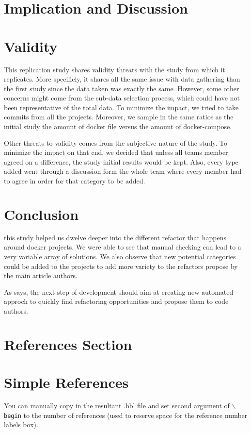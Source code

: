 \documentclass[lettersize,journal]{IEEEtran}
\begin{document}
\section{Implication and Discussion}

\section{Validity}

This replication study shares validity threats with the study from \cite{1} which it replicates.
More specificly, it shares all the same issue with data gathering than the first study since the data taken was exactly the same.
However, some other concerns might come from the sub-data selection process, which could have not been representative of the total data.
To minimize the impact, we tried to take commits from all the projects.
Moreover, we sample in the same ratios as the initial study the amount of docker file versus the amount of docker-compose.

Other threats to validity comes from the subjective nature of the study.
To minimize the impact on that end, we decided that unless all teams member agreed on a difference, the study initial results would be kept.
Also, every type added went through a discussion form the whole team where every member had to agree in order for that category to be added.

\section{Conclusion}
this study helped us dwelve deeper into the different refactor that happens around docker projects.
We were able to see that manual checking can lead to a very variable array of solutions.
We also observe that new potential categories could be added to the projects to add more variety to the refactors propose by the main article authors.

As \cite{1} says, the next step of development should aim at creating new automated approch to quickly find refactoring opportunities and propose them to code authors.

\section{References Section}
%
\section{Simple References}
You can manually copy in the resultant .bbl file and set second argument of $\backslash${\tt{begin}} to the number of references
 (used to reserve space for the reference number labels box).
\end{document}
